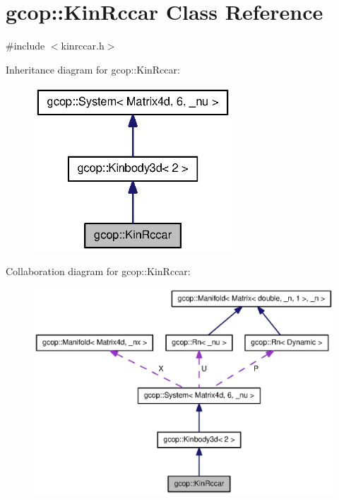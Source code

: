 \section{gcop\-:\-:\-Kin\-Rccar \-Class \-Reference}
\label{classgcop_1_1KinRccar}


{\ttfamily \#include $<$kinrccar.\-h$>$}



\-Inheritance diagram for gcop\-:\-:\-Kin\-Rccar\-:
\nopagebreak
\begin{figure}[H]
\begin{center}
\leavevmode
\includegraphics[width=210pt]{classgcop_1_1KinRccar__inherit__graph}
\end{center}
\end{figure}


\-Collaboration diagram for gcop\-:\-:\-Kin\-Rccar\-:
\nopagebreak
\begin{figure}[H]
\begin{center}
\leavevmode
\includegraphics[width=350pt]{classgcop_1_1KinRccar__coll__graph}
\end{center}
\end{figure}
